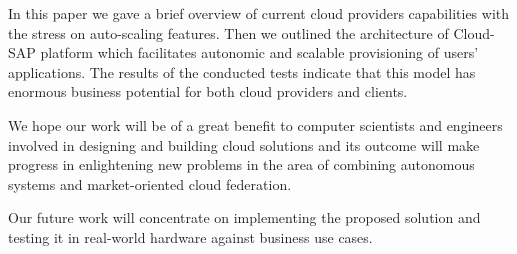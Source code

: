 \documentclass[twocolumn]{svjour3}          %
\begin{document}
In this paper we gave a brief overview of current cloud providers capabilities with the stress on auto-scaling features. Then we outlined the architecture of Cloud-SAP platform which facilitates autonomic and scalable provisioning of users' applications. The results of the conducted tests indicate that this model has enormous business potential for both cloud providers and clients.

We hope our work will be of a great benefit to computer scientists and engineers involved in designing and building cloud solutions and its outcome will make progress in enlightening new problems in the area of combining autonomous systems and market-oriented cloud federation.

Our future work will concentrate on implementing the proposed solution and testing it in real-world hardware against business use cases.


%
%
\end{document}
